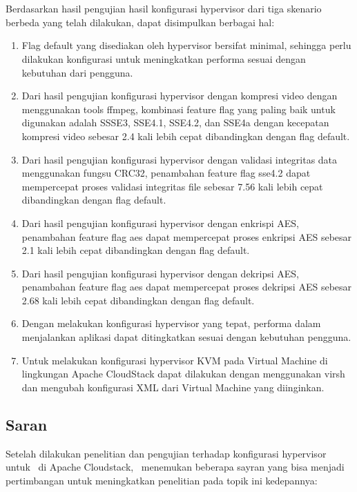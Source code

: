 \chapter{\babLima}

Berdasarkan hasil pengujian hasil konfigurasi hypervisor dari tiga skenario berbeda yang telah dilakukan, dapat disimpulkan berbagai hal:

\begin{enumerate}
	\item Flag default yang disediakan oleh hypervisor bersifat minimal, sehingga perlu dilakukan konfigurasi untuk meningkatkan performa sesuai dengan kebutuhan dari pengguna.
	\item Dari hasil pengujian konfigurasi hypervisor dengan kompresi video dengan menggunakan tools ffmpeg, kombinasi feature flag yang paling baik untuk digunakan adalah SSSE3, SSE4.1, SSE4.2, dan SSE4a dengan kecepatan kompresi video sebesar 2.4 kali lebih cepat dibandingkan dengan flag default.
	\item Dari hasil pengujian konfigurasi hypervisor dengan validasi integritas data menggunakan fungsu CRC32, penambahan feature flag sse4.2 dapat mempercepat proses validasi integritas file sebesar 7.56 kali lebih cepat dibandingkan dengan flag default.
	\item Dari hasil pengujian konfigurasi hypervisor dengan enkrispi AES, penambahan feature flag aes dapat mempercepat proses enkripsi AES sebesar 2.1 kali lebih cepat dibandingkan dengan flag default.
	\item Dari hasil pengujian konfigurasi hypervisor dengan dekripsi AES, penambahan feature flag aes dapat mempercepat proses dekripsi AES sebesar 2.68 kali lebih cepat dibandingkan dengan flag default.
	\item Dengan melakukan konfigurasi hypervisor yang tepat, performa dalam menjalankan aplikasi dapat ditingkatkan sesuai dengan kebutuhan pengguna.
	\item Untuk melakukan konfigurasi hypervisor KVM pada Virtual Machine di lingkungan Apache CloudStack dapat dilakukan dengan menggunakan virsh dan mengubah konfigurasi XML dari Virtual Machine yang diinginkan.
\end{enumerate}

\section{Saran}
Setelah dilakukan penelitian dan pengujian terhadap konfigurasi hypervisor untuk \vm\ di Apache Cloudstack, \saya\ menemukan beberapa sayran yang bisa menjadi pertimbangan untuk meningkatkan penelitian pada topik ini kedepannya:


